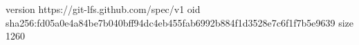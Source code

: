 version https://git-lfs.github.com/spec/v1
oid sha256:fd05a0e4a84be7b040bff94dc4eb455fab6992b884f1d3528e7c6f1f7b5e9639
size 1260
